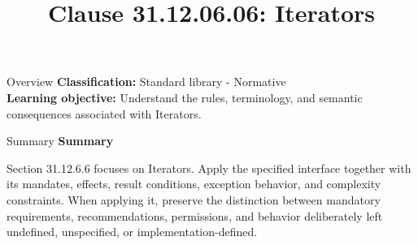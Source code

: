 \documentclass[10pt,letterpaper]{article}
\title{Clause 31.12.06.06: Iterators}
\author{}
\date{}
\begin{document}
\maketitle
\begin{CornellOverviewBox}{Overview}
\textbf{Classification:} Standard library - Normative\\[2pt]
\textbf{Learning objective:} Understand the rules, terminology, and semantic consequences associated with Iterators.
\end{CornellOverviewBox}\begin{CornellSummaryBox}{Summary}
{\sffamily\bfseries\color{Accent} Summary}\par\vspace{3pt}Section 31.12.6.6 focuses on Iterators. Apply the specified interface together with its mandates, effects, result conditions, exception behavior, and complexity constraints. When applying it, preserve the distinction between mandatory requirements, recommendations, permissions, and behavior deliberately left undefined, unspecified, or implementation-defined.
\end{CornellSummaryBox}
\end{document}
